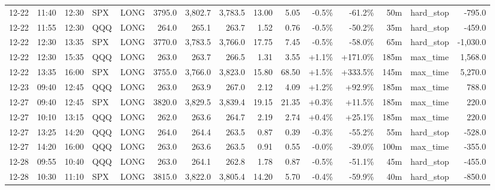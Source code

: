 \documentclass[11pt,a4paper,twoside]{article}
\begin{document}
\begin{landscape}
\begin{center}
\begin{longtable}{>{\color{txtmain}}l l l l l r r r r r r r r >{\color{txtmain}}l r}
12-22 & 11:40 & 12:30 & SPX & LONG & 3795.0 & 3,802.7 & 3,783.5 & 13.00 & 5.05 & \textcolor{lossred}{-0.5\%} & \textcolor{lossred}{-61.2\%} & 50m & hard\_stop & \textcolor{lossred}{-795.0} \\
12-22 & 11:55 & 12:30 & QQQ & LONG & 264.0 & 265.1 & 263.7 & 1.52 & 0.76 & \textcolor{lossred}{-0.5\%} & \textcolor{lossred}{-50.2\%} & 35m & hard\_stop & \textcolor{lossred}{-459.0} \\
12-22 & 12:30 & 13:35 & SPX & LONG & 3770.0 & 3,783.5 & 3,766.0 & 17.75 & 7.45 & \textcolor{lossred}{-0.5\%} & \textcolor{lossred}{-58.0\%} & 65m & hard\_stop & \textcolor{lossred}{-1,030.0} \\
12-22 & 12:30 & 15:35 & QQQ & LONG & 263.0 & 263.7 & 266.5 & 1.31 & 3.55 & \textcolor{wingreen}{+1.1\%} & \textcolor{wingreen}{+171.0\%} & 185m & max\_time & \textcolor{wingreen}{1,568.0} \\
12-22 & 13:35 & 16:00 & SPX & LONG & 3755.0 & 3,766.0 & 3,823.0 & 15.80 & 68.50 & \textcolor{wingreen}{+1.5\%} & \textcolor{wingreen}{+333.5\%} & 145m & max\_time & \textcolor{wingreen}{5,270.0} \\
12-23 & 09:40 & 12:45 & QQQ & LONG & 263.0 & 263.9 & 267.0 & 2.12 & 4.09 & \textcolor{wingreen}{+1.2\%} & \textcolor{wingreen}{+92.9\%} & 185m & max\_time & \textcolor{wingreen}{788.0} \\
12-27 & 09:40 & 12:45 & SPX & LONG & 3820.0 & 3,829.5 & 3,839.4 & 19.15 & 21.35 & \textcolor{wingreen}{+0.3\%} & \textcolor{wingreen}{+11.5\%} & 185m & max\_time & \textcolor{wingreen}{220.0} \\
12-27 & 10:10 & 13:15 & QQQ & LONG & 262.0 & 263.6 & 264.7 & 2.19 & 2.74 & \textcolor{wingreen}{+0.4\%} & \textcolor{wingreen}{+25.1\%} & 185m & max\_time & \textcolor{wingreen}{220.0} \\
12-27 & 13:25 & 14:20 & QQQ & LONG & 264.0 & 264.4 & 263.5 & 0.87 & 0.39 & \textcolor{lossred}{-0.3\%} & \textcolor{lossred}{-55.2\%} & 55m & hard\_stop & \textcolor{lossred}{-528.0} \\
12-27 & 14:20 & 16:00 & QQQ & LONG & 263.0 & 263.6 & 263.5 & 0.91 & 0.55 & \textcolor{lossred}{-0.0\%} & \textcolor{lossred}{-39.0\%} & 100m & max\_time & \textcolor{lossred}{-355.0} \\
12-28 & 09:55 & 10:40 & QQQ & LONG & 263.0 & 264.1 & 262.8 & 1.78 & 0.87 & \textcolor{lossred}{-0.5\%} & \textcolor{lossred}{-51.1\%} & 45m & hard\_stop & \textcolor{lossred}{-455.0} \\
12-28 & 10:30 & 11:10 & SPX & LONG & 3815.0 & 3,822.0 & 3,805.4 & 14.20 & 5.70 & \textcolor{lossred}{-0.4\%} & \textcolor{lossred}{-59.9\%} & 40m & hard\_stop & \textcolor{lossred}{-850.0} \\

\end{longtable}
\end{center}
\end{landscape}
\end{document}
